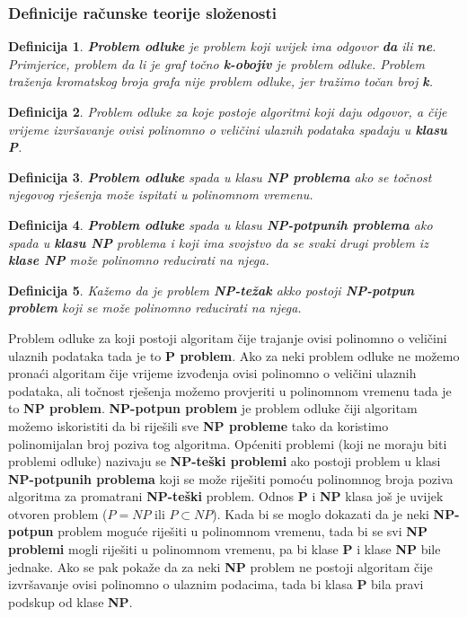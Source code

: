 \documentclass[times, utf8, diplomski, numeric]{fer}
\newtheorem{definition}{Definicija}
\begin{document}
\subsubsection{Definicije računske teorije složenosti}

\begin{definition}
\textbf{Problem odluke} je problem koji uvijek ima odgovor \textbf{da} ili \textbf{ne}. Primjerice, problem da li je graf točno \textbf{k-obojiv} je problem odluke. Problem traženja kromatskog broja grafa nije problem odluke, jer tražimo točan broj \textbf{k}.
\end{definition}

\begin{definition}
Problem odluke za koje postoje algoritmi koji daju odgovor, a čije vrijeme izvršavanje ovisi polinomno o veličini ulaznih podataka spadaju u \textbf{klasu P}.
\end{definition}

\begin{definition}
\textbf{Problem odluke} spada u klasu \textbf{NP problema} ako se točnost njegovog rješenja može ispitati u polinomnom vremenu. 
\end{definition}

\begin{definition}
\textbf{Problem odluke} spada u klasu \textbf{NP-potpunih problema} ako spada u \textbf{klasu NP} problema i koji ima svojstvo da se svaki drugi problem iz \textbf{klase NP} može polinomno reducirati na njega. 
\end{definition}

\begin{definition}
Kažemo da je problem \textbf{NP-težak} akko postoji \textbf{NP-potpun problem} koji se može polinomno reducirati na njega.
\end{definition}

Problem odluke za koji postoji algoritam čije trajanje ovisi polinomno o veličini ulaznih podataka tada je to \textbf{P problem}. Ako za neki problem odluke ne možemo pronaći algoritam čije vrijeme izvođenja ovisi polinomno o veličini ulaznih podataka, ali točnost rješenja možemo provjeriti u polinomnom vremenu tada je to \textbf{NP problem}. \textbf{NP-potpun problem} je problem odluke čiji algoritam možemo iskoristiti da bi riješili sve \textbf{NP probleme} tako da koristimo polinomijalan broj poziva tog algoritma. Općeniti problemi (koji ne moraju biti problemi odluke) nazivaju se \textbf{NP-teški problemi} ako postoji problem u klasi \textbf{NP-potpunih problema} koji se može riješiti pomoću polinomnog broja poziva algoritma za promatrani \textbf{NP-teški} problem. Odnos \textbf{P} i \textbf{NP} klasa još je uvijek otvoren problem ($P=NP$ ili $P\subset NP$). Kada bi se moglo dokazati da je neki \textbf{NP-potpun} problem moguće riješiti u polinomnom vremenu, tada bi se svi \textbf{NP problemi} mogli riješiti u polinomnom vremenu, pa bi klase \textbf{P} i klase \textbf{NP} bile jednake. Ako se pak pokaže da za neki \textbf{NP} problem ne postoji algoritam čije izvršavanje ovisi polinomno o ulaznim podacima, tada bi klasa \textbf{P} bila pravi podskup od klase \textbf{NP}.  
\end{document}
